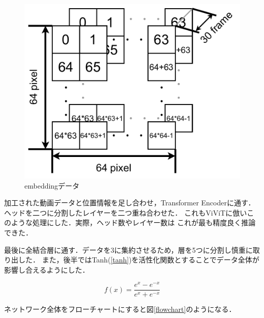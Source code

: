 \begin{figure}[b]
  \begin{center}
    \includegraphics[width=120mm]{images/chart/embedding.pdf}
  \end{center}
  \caption{embeddingデータ}
  \label{embedding}
\end{figure}

加工された動画データと位置情報を足し合わせ，Transformer Encoderに通す．
ヘッドを二つに分割したレイヤーを二つ重ね合わせた．
これもViViTに倣いこのような処理にした．実際，ヘッド数やレイヤー数は
これが最も精度良く推論できた．
\clearpage

最後に全結合層に通す．データを3に集約させるため，層を5つに分割し慎重に取り出した．
また，後半ではTanh(\ref{tanh})を活性化関数とすることでデータ全体が影響し合えるようにした．

\begin{equation}
  f(x) = \frac{e^x - e^{-x}}{e^x + e^{-x}}
  \label{tanh}
\end{equation}

ネットワーク全体をフローチャートにすると図\ref{flowchart}のようになる．

